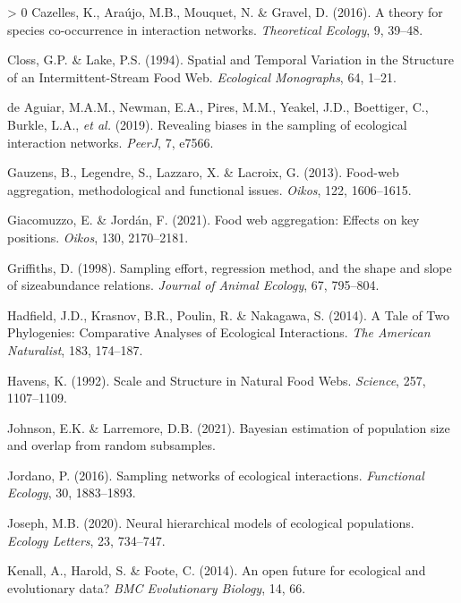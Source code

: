 \documentclass[11pt]{article}
\newlength{\cslhangindent}
\newenvironment{CSLReferences}[3] %
 {%
  \setlength{\parindent}{0pt}
  \ifodd #1 \everypar{\setlength{\hangindent}{\cslhangindent}}\ignorespaces\fi
  \ifnum #2 > 0
  \setlength{\parskip}{#2\baselineskip}
  \fi
 }%
 {}
\begin{document}
\begin{CSLReferences}{1}{0}
\leavevmode\hypertarget{ref-Cazelles2016TheSpe}{}%
Cazelles, K., Araújo, M.B., Mouquet, N. \& Gravel, D. (2016). A theory
for species co-occurrence in interaction networks. \emph{Theoretical
Ecology}, 9, 39--48.

\leavevmode\hypertarget{ref-Closs1994SpaTem}{}%
Closs, G.P. \& Lake, P.S. (1994). Spatial and Temporal Variation in the
Structure of an Intermittent-Stream Food Web. \emph{Ecological
Monographs}, 64, 1--21.

\leavevmode\hypertarget{ref-deAguiar2019RevBia}{}%
de Aguiar, M.A.M., Newman, E.A., Pires, M.M., Yeakel, J.D., Boettiger,
C., Burkle, L.A., \emph{et al.} (2019). Revealing biases in the sampling
of ecological interaction networks. \emph{PeerJ}, 7, e7566.

\leavevmode\hypertarget{ref-Gauzens2013FooAgg}{}%
Gauzens, B., Legendre, S., Lazzaro, X. \& Lacroix, G. (2013). Food-web
aggregation, methodological and functional issues. \emph{Oikos}, 122,
1606--1615.

\leavevmode\hypertarget{ref-Giacomuzzo2021FooWeb}{}%
Giacomuzzo, E. \& Jordán, F. (2021). Food web aggregation: Effects on
key positions. \emph{Oikos}, 130, 2170--2181.

\leavevmode\hypertarget{ref-Griffiths1998SamEff}{}%
Griffiths, D. (1998). Sampling effort, regression method, and the shape
and slope of sizeabundance relations. \emph{Journal of Animal Ecology},
67, 795--804.

\leavevmode\hypertarget{ref-Hadfield2014TalTwo}{}%
Hadfield, J.D., Krasnov, B.R., Poulin, R. \& Nakagawa, S. (2014). A Tale
of Two Phylogenies: Comparative Analyses of Ecological Interactions.
\emph{The American Naturalist}, 183, 174--187.

\leavevmode\hypertarget{ref-Havens1992ScaStr}{}%
Havens, K. (1992). Scale and Structure in Natural Food Webs.
\emph{Science}, 257, 1107--1109.

\leavevmode\hypertarget{ref-Johnson2021BayEst}{}%
Johnson, E.K. \& Larremore, D.B. (2021). Bayesian estimation of
population size and overlap from random subsamples.

\leavevmode\hypertarget{ref-Jordano2016SamNet}{}%
Jordano, P. (2016). Sampling networks of ecological interactions.
\emph{Functional Ecology}, 30, 1883--1893.

\leavevmode\hypertarget{ref-Joseph2020NeuHie}{}%
Joseph, M.B. (2020). Neural hierarchical models of ecological
populations. \emph{Ecology Letters}, 23, 734--747.

\leavevmode\hypertarget{ref-Kenall2014OpeFut}{}%
Kenall, A., Harold, S. \& Foote, C. (2014). An open future for
ecological and evolutionary data? \emph{BMC Evolutionary Biology}, 14,
66.


\end{CSLReferences}
\end{document}
